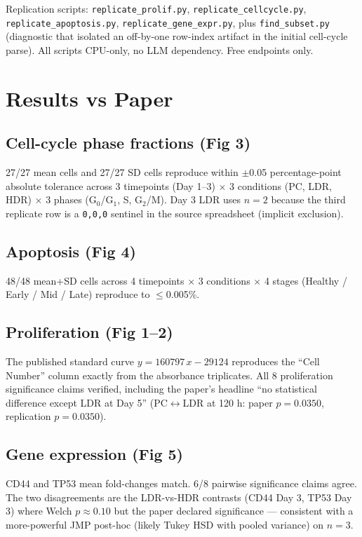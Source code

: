 \documentclass[11pt]{article}
\begin{document}
Replication scripts: \texttt{replicate\_prolif.py}, \texttt{replicate\_cellcycle.py},
\texttt{replicate\_apoptosis.py}, \texttt{replicate\_gene\_expr.py}, plus \texttt{find\_subset.py}
(diagnostic that isolated an off-by-one row-index artifact in the initial cell-cycle parse).
All scripts CPU-only, no LLM dependency. Free endpoints only.

\section{Results vs Paper}
\subsection{Cell-cycle phase fractions (Fig 3)}
27/27 mean cells and 27/27 SD cells reproduce within $\pm$0.05 percentage-point absolute tolerance
across 3 timepoints (Day 1--3) $\times$ 3 conditions (PC, LDR, HDR) $\times$ 3 phases
(G$_0$/G$_1$, S, G$_2$/M). Day 3 LDR uses $n{=}2$ because the third replicate row is a
\texttt{0,0,0} sentinel in the source spreadsheet (implicit exclusion).

\subsection{Apoptosis (Fig 4)}
48/48 mean+SD cells across 4 timepoints $\times$ 3 conditions $\times$ 4 stages
(Healthy / Early / Mid / Late) reproduce to $\le$0.005\%.

\subsection{Proliferation (Fig 1--2)}
The published standard curve $y = 160797\,x - 29124$ reproduces the ``Cell Number'' column exactly
from the absorbance triplicates. All 8 proliferation significance claims verified, including the
paper's headline ``no statistical difference except LDR at Day 5'' (PC$\leftrightarrow$LDR at 120 h:
paper $p=0.0350$, replication $p=0.0350$).

\subsection{Gene expression (Fig 5)}
CD44 and TP53 mean fold-changes match. 6/8 pairwise significance claims agree. The two disagreements
are the LDR-vs-HDR contrasts (CD44 Day 3, TP53 Day 3) where Welch $p \approx 0.10$ but the paper
declared significance --- consistent with a more-powerful JMP post-hoc (likely Tukey HSD with
pooled variance) on $n{=}3$.
\end{document}
